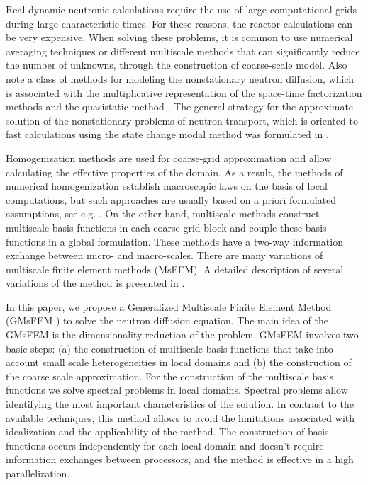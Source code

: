 \documentclass[runningheads]{llncs}
\begin{document}
Real dynamic neutronic calculations require the use of large computational grids during large characteristic times. For these reasons, the reactor calculations can be very expensive.
When solving these problems, it is common to use numerical averaging techniques or different multiscale methods that can significantly reduce the number of unknowns, through the construction of coarse-scale model.
Also note a class of methods for modeling the nonstationary  neutron diffusion, which is associated with the multiplicative representation of the space-time factorization methods and the quasistatic method \cite{dulla2008quasi}. The general strategy for the approximate solution of the nonstationary problems of neutron transport, which is oriented to fast calculations using the state change modal method was formulated in \cite{Progress18}.

Homogenization methods are used for coarse-grid approximation and allow calculating the effective properties of the domain.
As a result, the methods of numerical homogenization establish macroscopic laws on the basis of local computations, but such approaches are usually based on a priori formulated assumptions, see e.g. \cite{Stalnov2017,Bakhvalov2012}. 
On the other hand, multiscale methods construct multiscale basis functions in each coarse-grid block and couple these basis functions in a global formulation. 
These methods have a two-way information exchange between micro- and macro-scales. 
There are many variations of multiscale finite element methods (MsFEM).
A detailed description of several variations of the method is presented in \cite{Efendiev2009}.

In this paper, we propose a Generalized Multiscale Finite Element Method (GMsFEM \cite{Spiridonov2019}) to solve the neutron diffusion equation. 
The main idea of the GMsFEM is the dimensionality reduction of the problem. 
GMsFEM  involves two basic steps: (a) the construction of multiscale basis functions that take into account small scale heterogeneities in local domains and (b) the construction of the coarse scale approximation. 
For the construction of the multiscale basis functions we solve spectral problems in local domains.
Spectral problems allow identifying the most important characteristics of the solution. 
In contrast to the available techniques, this method allows to avoid the limitations associated with idealization and the applicability of the method.
The construction of basis functions occurs independently for each local domain and doesn't require information exchanges between processors, and the method is effective in a high parallelization.
\end{document}
